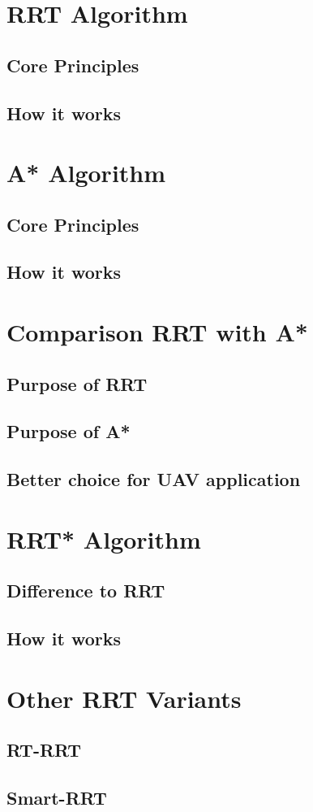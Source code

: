 \section{RRT Algorithm}

\subsection{Core Principles}

\subsection{How it works}

\section{A* Algorithm}

\subsection{Core Principles}

\subsection{How it works}

\section{Comparison RRT with A*}

\subsection{Purpose of RRT}

\subsection{Purpose of A*}

\subsection{Better choice for UAV application}

\section{RRT* Algorithm}

\subsection{Difference to RRT}

\subsection{How it works}

\section{Other RRT Variants}

\subsection{RT-RRT}

\subsection{Smart-RRT}
